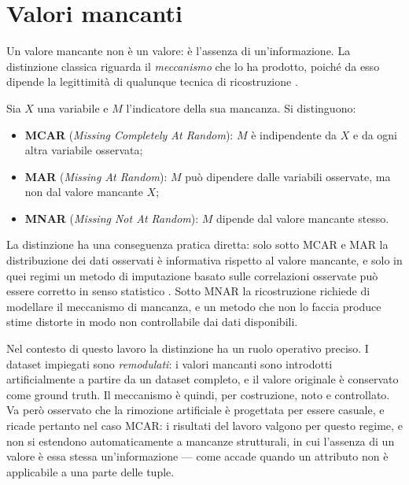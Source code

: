\section{Valori mancanti}\label{sec:missing}

Un valore mancante non è un valore: è l'assenza di un'informazione. La distinzione classica
riguarda il \emph{meccanismo} che lo ha prodotto, poiché da esso dipende la legittimità di
qualunque tecnica di ricostruzione \cite{rubin1976inference}.

\begin{definition}
Sia $X$ una variabile e $M$ l'indicatore della sua mancanza. Si distinguono:
\begin{itemize}[leftmargin=1.4em]
    \item \textbf{MCAR} (\emph{Missing Completely At Random}): $M$ è indipendente da $X$ e da
    ogni altra variabile osservata;
    \item \textbf{MAR} (\emph{Missing At Random}): $M$ può dipendere dalle variabili osservate,
    ma non dal valore mancante $X$;
    \item \textbf{MNAR} (\emph{Missing Not At Random}): $M$ dipende dal valore mancante stesso.
\end{itemize}
\end{definition}

La distinzione ha una conseguenza pratica diretta: solo sotto MCAR e MAR la distribuzione dei
dati osservati è informativa rispetto al valore mancante, e solo in quei regimi un metodo di
imputazione basato sulle correlazioni osservate può essere corretto in senso statistico
\cite{little2019statistical}. Sotto MNAR la ricostruzione richiede di modellare il meccanismo di
mancanza, e un metodo che non lo faccia produce stime distorte in modo non controllabile dai dati
disponibili.

Nel contesto di questo lavoro la distinzione ha un ruolo operativo preciso. I dataset impiegati
sono \emph{remodulati}: i valori mancanti sono introdotti artificialmente a partire da un dataset
completo, e il valore originale è conservato come ground truth. Il meccanismo è quindi, per
costruzione, noto e controllato. Va però osservato che la rimozione artificiale è progettata per
essere casuale, e ricade pertanto nel caso MCAR: i risultati del lavoro valgono per questo regime,
e non si estendono automaticamente a mancanze strutturali, in cui l'assenza di un valore è essa
stessa un'informazione --- come accade quando un attributo non è applicabile a una parte delle
tuple.

